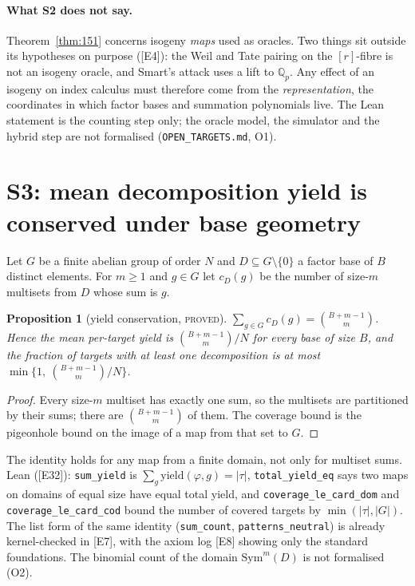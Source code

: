 \documentclass[10pt,a4paper]{article}
\newcommand{\ev}[1]{\textup{[#1]}}
\newtheorem{proposition}[theorem]{Proposition}
\theoremstyle{definition}
\theoremstyle{remark}
\begin{document}
\paragraph{What S2 does not say.}
Theorem~\ref{thm:151} concerns isogeny \emph{maps} used as oracles. Two things sit
outside its hypotheses on purpose (\ev{E4}): the Weil and Tate pairing on the
$[r]$-fibre is not an isogeny oracle, and Smart's attack uses a lift to $\mathbb{Q}_p$.
Any effect of an isogeny on index calculus must therefore come from the
\emph{representation}, the coordinates in which factor bases and summation
polynomials live. The Lean statement is the counting step only; the oracle model,
the simulator and the hybrid step are not formalised (\texttt{OPEN\_TARGETS.md}, O1).

\section{S3: mean decomposition yield is conserved under base geometry}
\label{sec:s3}

Let $G$ be a finite abelian group of order $N$ and $D\subseteq G\setminus\{0\}$ a
factor base of $B$ distinct elements. For $m\ge1$ and $g\in G$ let $c_D(g)$ be the
number of size-$m$ multisets from $D$ whose sum is $g$.

\begin{proposition}[yield conservation, \textsc{proved}]
\label{prop:yield}
$\sum_{g\in G} c_D(g)=\binom{B+m-1}{m}$. Hence the mean per-target yield is
$\binom{B+m-1}{m}/N$ for every base of size $B$, and the fraction of targets with
at least one decomposition is at most $\min\{1,\ \binom{B+m-1}{m}/N\}$.
\end{proposition}
\begin{proof}
Every size-$m$ multiset has exactly one sum, so the multisets are partitioned by
their sums; there are $\binom{B+m-1}{m}$ of them. The coverage bound is the
pigeonhole bound on the image of a map from that set to $G$. \qedhere
\end{proof}

The identity holds for any map from a finite domain, not only for multiset sums.
Lean (\ev{E32}): \texttt{sum\_yield} is $\sum_g \mathrm{yield}(\varphi,g)=|\tau|$,
\texttt{total\_yield\_eq} says two maps on domains of equal size have equal total
yield, and \texttt{coverage\_le\_card\_dom} and \texttt{coverage\_le\_card\_cod}
bound the number of covered targets by $\min(|\tau|,|G|)$. The list form of the same
identity (\texttt{sum\_count}, \texttt{patterns\_neutral}) is already kernel-checked
in \ev{E7}, with the axiom log \ev{E8} showing only the standard foundations. The
binomial count of the domain $\mathrm{Sym}^m(D)$ is not formalised (O2).
\end{document}
